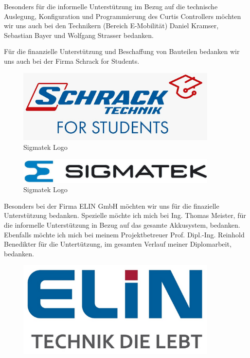 Besonders für die informelle Unterstützung im Bezug auf die technische Auslegung, Konfiguration und Programmierung des Curtis Controllers möchten wir uns auch bei den Technikern (Bereich E-Mobilität) Daniel Kramser, Sebastian Bayer und Wolfgang Strasser bedanken.

Für die finanzielle Unterstützung und Beschaffung von Bauteilen bedanken wir uns auch bei der Firma Schrack for Students.

\begin{figure}[H]
	\begin{center}
		\includegraphics[width=10cm]{figures/allgemein/Schrack_Logo.jpg}
		\caption{Sigmatek Logo}
	\end{center}
\end{figure}

\begin{figure}[H]
	\begin{center}
		\includegraphics[width=10cm]{figures/allgemein/Sigmatek_LOGO.jpg}
		\caption{Sigmatek Logo}
	\end{center}
\end{figure}

\vspace{1cm}

Besonders bei der Firma ELIN GmbH möchten wir uns für die finazielle Unterstützung bedanken. Spezielle möchte ich mich bei Ing. Thomas Meister, für die informelle Unterstützung in Bezug auf das gesamte Akkusystem, bedanken.
Ebenfalls möchte ich mich bei meinem Projektbetreuer Prof. Dipl.-Ing. Reinhold Benedikter für die Untertützung, im gesamten Verlauf meiner Diplomarbeit, bedanken.

\begin{figure}[H]
	\begin{center}
		\includegraphics[width=10cm]{figures/allgemein/Elin Logo.png}
	\end{center}
\end{figure}
\vspace{1cm}

